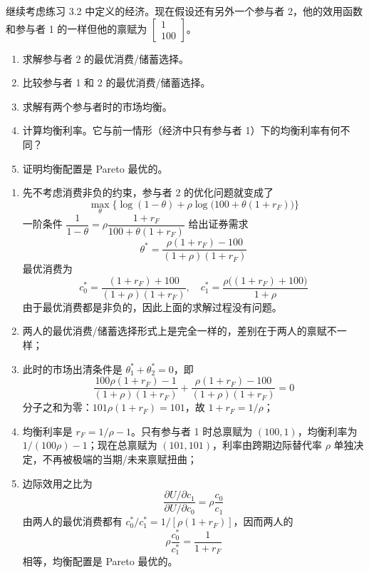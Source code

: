 \begin{problem}
 继续考虑练习 3.2 中定义的经济。现在假设还有另外一个参与者 2，他的效用函数和参与者 1 的一样但他的禀赋为 $\begin{bmatrix}1 \\ 100\end{bmatrix}$。
\begin{enumerate}[label=(\alph*)]
    \item 求解参与者 2 的最优消费/储蓄选择。
    \item 比较参与者 1 和 2 的最优消费/储蓄选择。
    \item 求解有两个参与者时的市场均衡。
    \item 计算均衡利率。它与前一情形（经济中只有参与者 1）下的均衡利率有何不同？
    \item 证明均衡配置是 Pareto 最优的。
\end{enumerate}
\end{problem}
\begin{solution}
\begin{enumerate}[label=(\alph*)]
    \item 先不考虑消费非负的约束，参与者 2 的优化问题就变成了
    \[
        \max_{\theta}\bigl\{\log(1-\theta)+\rho\log\bigl(100+\theta(1+r_{F})\bigr)\bigr\}
    \]
    一阶条件 $\dfrac{1}{1-\theta}=\rho\dfrac{1+r_{F}}{100+\theta(1+r_{F})}$ 给出证券需求
    \[
        \theta^{*}=\frac{\rho(1+r_{F})-100}{(1+\rho)(1+r_{F})}
    \]
    最优消费为
    \[
        c_{0}^{*}=\frac{(1+r_{F})+100}{(1+\rho)(1+r_{F})},\quad
        c_{1}^{*}=\frac{\rho\bigl((1+r_{F})+100\bigr)}{1+\rho}
    \]
    由于最优消费都是非负的，因此上面的求解过程没有问题。
    \item 两人的最优消费/储蓄选择形式上是完全一样的，差别在于两人的禀赋不一样；
    \item 此时的市场出清条件是 $\theta_{1}^{*}+\theta_{2}^{*}=0$，即
    \[
        \frac{100\rho(1+r_{F})-1}{(1+\rho)(1+r_{F})}+\frac{\rho(1+r_{F})-100}{(1+\rho)(1+r_{F})}=0
    \]
    分子之和为零：$101\rho(1+r_{F})=101$，故 $1+r_{F}=1/\rho$；
    \item 均衡利率是 $r_{F}=1/\rho-1$。只有参与者 1 时总禀赋为 $(100,1)$，均衡利率为 $1/(100\rho)-1$；现在总禀赋为 $(101,101)$，利率由跨期边际替代率 $\rho$ 单独决定，不再被极端的当期/未来禀赋扭曲；
    \item 边际效用之比为
    \[
        \frac{\partial U/\partial c_{1}}{\partial U/\partial c_{0}}=\rho\frac{c_{0}}{c_{1}}
    \]
    由两人的最优消费都有 $c_{0}^{*}/c_{1}^{*}=1/[\rho(1+r_{F})]$，因而两人的
    \[
        \rho\frac{c_{0}^{*}}{c_{1}^{*}}=\frac{1}{1+r_{F}}
    \]
    相等，均衡配置是 Pareto 最优的。
\end{enumerate}
\end{solution}

